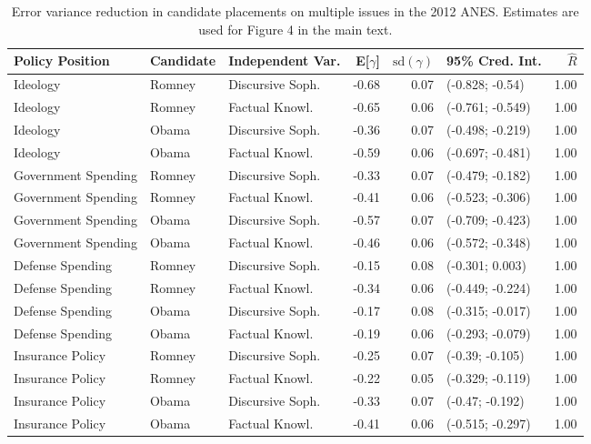 \begin{table}[ht]
\centering
\caption{Error variance reduction in candidate placements on multiple issues in the 2012 ANES. 
         Estimates are used for Figure 4 in the main text.} 
\label{app:hetreg2012}
\begin{tabular}{lllrrlr}
  \hline
Policy Position & Candidate & Independent Var. & E[$\gamma$] & $\text{sd}(\gamma)$ & 95\% Cred. Int. & $\hat{R}$ \\ 
  \hline
Ideology & Romney & Discursive Soph. & -0.68 & 0.07 & (-0.828; -0.54) & 1.00 \\ 
  Ideology & Romney & Factual Knowl. & -0.65 & 0.06 & (-0.761; -0.549) & 1.00 \\ 
  Ideology & Obama & Discursive Soph. & -0.36 & 0.07 & (-0.498; -0.219) & 1.00 \\ 
  Ideology & Obama & Factual Knowl. & -0.59 & 0.06 & (-0.697; -0.481) & 1.00 \\ 
  Government Spending & Romney & Discursive Soph. & -0.33 & 0.07 & (-0.479; -0.182) & 1.00 \\ 
  Government Spending & Romney & Factual Knowl. & -0.41 & 0.06 & (-0.523; -0.306) & 1.00 \\ 
  Government Spending & Obama & Discursive Soph. & -0.57 & 0.07 & (-0.709; -0.423) & 1.00 \\ 
  Government Spending & Obama & Factual Knowl. & -0.46 & 0.06 & (-0.572; -0.348) & 1.00 \\ 
  Defense Spending & Romney & Discursive Soph. & -0.15 & 0.08 & (-0.301; 0.003) & 1.00 \\ 
  Defense Spending & Romney & Factual Knowl. & -0.34 & 0.06 & (-0.449; -0.224) & 1.00 \\ 
  Defense Spending & Obama & Discursive Soph. & -0.17 & 0.08 & (-0.315; -0.017) & 1.00 \\ 
  Defense Spending & Obama & Factual Knowl. & -0.19 & 0.06 & (-0.293; -0.079) & 1.00 \\ 
  Insurance Policy & Romney & Discursive Soph. & -0.25 & 0.07 & (-0.39; -0.105) & 1.00 \\ 
  Insurance Policy & Romney & Factual Knowl. & -0.22 & 0.05 & (-0.329; -0.119) & 1.00 \\ 
  Insurance Policy & Obama & Discursive Soph. & -0.33 & 0.07 & (-0.47; -0.192) & 1.00 \\ 
  Insurance Policy & Obama & Factual Knowl. & -0.41 & 0.06 & (-0.515; -0.297) & 1.00 \\ 

\end{tabular}
\end{table}
